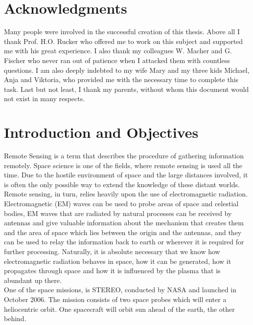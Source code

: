 \documentclass[a4paper,14pt]{extbook}
\begin{document}
\frontmatter

\chapter{Acknowledgments}
Many people were involved in the successful creation of this thesis. Above all I thank Prof. H.O. Rucker who offered me to work on this subject and supported me with his great experience. I also thank my colleagues W. Macher and G. Fischer who never ran out of patience when I attacked them with countless questions. I am also deeply indebted to my wife Mary and my three kids Michael, Anja and Viktoria, who provided me with the necessary time to complete this task. Last but not least, I thank my parents, without whom this document would not exist in many respects.

\tableofcontents
\newpage

\mainmatter

\chapter{Introduction and Objectives}

Remote Sensing is a term that describes the procedure of gathering information remotely. Space science is one of the fields, where remote sensing is used all the time. Due to the hostile environment of space and the large distances involved, it is often the only possible way to extend the knowledge of these distant worlds. Remote sensing, in turn, relies heavily upon the use of electromagnetic radiation. Electromagnetic (EM) waves can be used to probe areas of space and celestial bodies, EM waves that are radiated by natural processes can be received by antennas and give valuable information about the mechanism that creates them and the area of space which lies between the origin and the antennas, and they can be used to relay the information back to earth or wherever it is required for further processing. Naturally, it is absolute necessary that we know how electromagnetic radiation behaves in space, how it can be generated, how it propagates through space and how it is influenced by the plasma that is abundant up there.\\


One of the space missions, is STEREO, conducted by NASA and launched in October 2006. The mission consists of two space probes which will enter a heliocentric orbit. One spacecraft will orbit sun ahead of the earth, the other behind.\\
\end{document}
